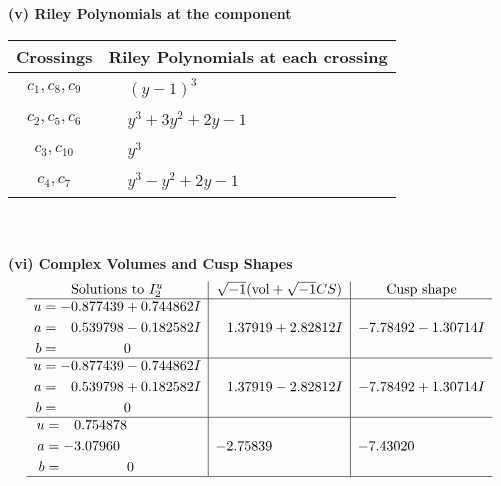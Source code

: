 \documentclass[1p]{elsarticle_modified}
\theoremstyle{definition}
\newcommand{\I}{\sqrt{-1}}
\begin{document}
\flushleft \textbf{(v) Riley Polynomials at the component}\newline \\
\begin{tabular}{m{50pt}|m{274pt}}
Crossings & \hspace{64pt}Riley Polynomials at each crossing \\
\hline $$\begin{aligned}c_{1},c_{8},c_{9}\end{aligned}$$&$\begin{aligned}
&(y-1)^3
\end{aligned}$\\
\hline $$\begin{aligned}c_{2},c_{5},c_{6}\end{aligned}$$&$\begin{aligned}
&y^3+3 y^2+2 y-1
\end{aligned}$\\
\hline $$\begin{aligned}c_{3},c_{10}\end{aligned}$$&$\begin{aligned}
&y^3
\end{aligned}$\\
\hline $$\begin{aligned}c_{4},c_{7}\end{aligned}$$&$\begin{aligned}
&y^3- y^2+2 y-1
\end{aligned}$\\
\hline
\end{tabular}\\~\\
\newpage\flushleft \textbf{(vi) Complex Volumes and Cusp Shapes}
$$\begin{array}{c|c|c}  
\text{Solutions to }I^u_{2}& \I (\text{vol} + \sqrt{-1}CS) & \text{Cusp shape}\\
 \hline 
\begin{aligned}
u &= -0.877439 + 0.744862 I \\
a &= \phantom{-}0.539798 - 0.182582 I \\
b &= \phantom{-0.000000 } 0\end{aligned}
 & \phantom{-}1.37919 + 2.82812 I & -7.78492 - 1.30714 I \\ \hline\begin{aligned}
u &= -0.877439 - 0.744862 I \\
a &= \phantom{-}0.539798 + 0.182582 I \\
b &= \phantom{-0.000000 } 0\end{aligned}
 & \phantom{-}1.37919 - 2.82812 I & -7.78492 + 1.30714 I \\ \hline\begin{aligned}
u &= \phantom{-}0.754878\phantom{ +0.000000I} \\
a &= -3.07960\phantom{ +0.000000I} \\
b &= \phantom{-0.000000 } 0\end{aligned}
 & -2.75839\phantom{ +0.000000I} & -7.43020\phantom{ +0.000000I}\\
 \hline 
 \end{array}$$\newpage\newpage\renewcommand{\arraystretch}{1}
\end{document}
